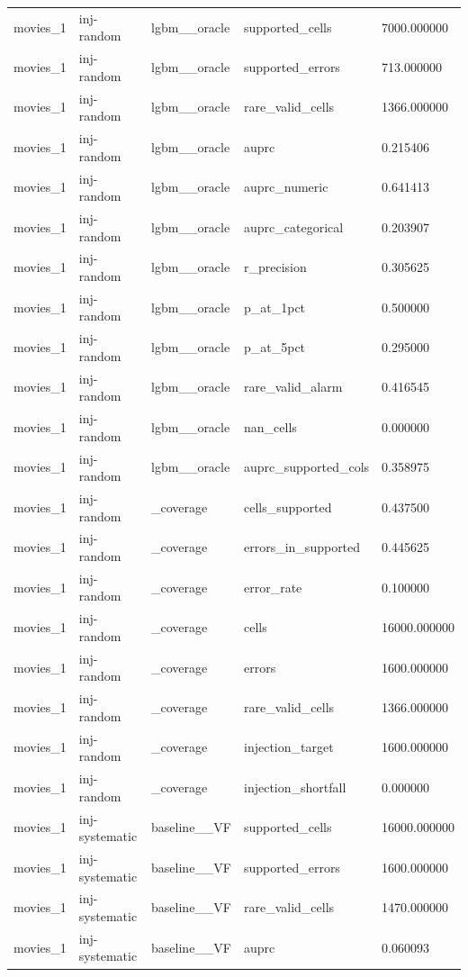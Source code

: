 \begin{tabular}{lllll}
movies\_1 & inj-random & lgbm\_\_oracle & supported\_cells & 7000.000000 \\
movies\_1 & inj-random & lgbm\_\_oracle & supported\_errors & 713.000000 \\
movies\_1 & inj-random & lgbm\_\_oracle & rare\_valid\_cells & 1366.000000 \\
movies\_1 & inj-random & lgbm\_\_oracle & auprc & 0.215406 \\
movies\_1 & inj-random & lgbm\_\_oracle & auprc\_numeric & 0.641413 \\
movies\_1 & inj-random & lgbm\_\_oracle & auprc\_categorical & 0.203907 \\
movies\_1 & inj-random & lgbm\_\_oracle & r\_precision & 0.305625 \\
movies\_1 & inj-random & lgbm\_\_oracle & p\_at\_1pct & 0.500000 \\
movies\_1 & inj-random & lgbm\_\_oracle & p\_at\_5pct & 0.295000 \\
movies\_1 & inj-random & lgbm\_\_oracle & rare\_valid\_alarm & 0.416545 \\
movies\_1 & inj-random & lgbm\_\_oracle & nan\_cells & 0.000000 \\
movies\_1 & inj-random & lgbm\_\_oracle & auprc\_supported\_cols & 0.358975 \\
movies\_1 & inj-random & \_coverage & cells\_supported & 0.437500 \\
movies\_1 & inj-random & \_coverage & errors\_in\_supported & 0.445625 \\
movies\_1 & inj-random & \_coverage & error\_rate & 0.100000 \\
movies\_1 & inj-random & \_coverage & cells & 16000.000000 \\
movies\_1 & inj-random & \_coverage & errors & 1600.000000 \\
movies\_1 & inj-random & \_coverage & rare\_valid\_cells & 1366.000000 \\
movies\_1 & inj-random & \_coverage & injection\_target & 1600.000000 \\
movies\_1 & inj-random & \_coverage & injection\_shortfall & 0.000000 \\
movies\_1 & inj-systematic & baseline\_\_VF & supported\_cells & 16000.000000 \\
movies\_1 & inj-systematic & baseline\_\_VF & supported\_errors & 1600.000000 \\
movies\_1 & inj-systematic & baseline\_\_VF & rare\_valid\_cells & 1470.000000 \\
movies\_1 & inj-systematic & baseline\_\_VF & auprc & 0.060093 \\

\end{tabular}
